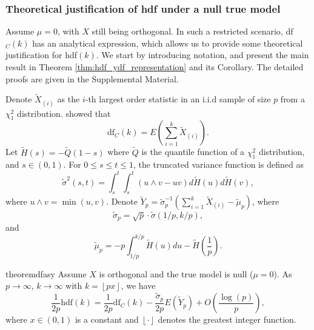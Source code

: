 \subsubsection{Theoretical justification of hdf under a null true model}
Assume $\mu=0$, with $X$ still being orthogonal. In such a restricted scenario, df$_C(k)$ has an analytical expression, which allows us to provide some theoretical justification for hdf$(k)$. We start by introducing notation, and present the main result in Theorem \ref{thm:hdf_ydf_representation} and its Corollary. The detailed proofs are given in the Supplemental Material.

Denote $\tilde{X}_{(i)}$ as the $i$-th largest order statistic in an i.i.d sample of size $p$ from a $\chi^2_1$ distribution. \citet{Ye1998} showed that
\begin{equation*}
\text{df}_C(k) = E\left( \sum_{i=1}^{k} \tilde{X}_{(i)} \right).
\end{equation*}
Let $\tilde{H}(s) = -\tilde{Q}(1-s)$ where $\tilde{Q}$ is the quantile function of a $\chi_1^2$ distribution, and $s\in (0,1)$. For $0\le s \le t \le 1$, the truncated variance function is defined as
\begin{equation*}
\tilde{\sigma}^2(s,t) = \int_{s}^{t} \int_{s}^{t} (u \wedge v -uv) d \tilde{H}(u) d \tilde{H}(v),
\end{equation*}
where $u \wedge v =\min(u,v)$. Denote $\tilde{Y}_p = \tilde{\sigma}_p^{-1}(\sum_{i=1}^k \tilde{X}_{(i)} - \tilde{\mu}_p)$, where
\begin{equation*}
\tilde{\sigma}_p = \sqrt{p} \cdot \tilde{\sigma}(1/p,k/p),
\end{equation*}
and
\begin{equation*}
\tilde{\mu}_p = -p \int_{1/p}^{k/p} \tilde{H}(u) du - \tilde{H}\left(\frac{1}{p}\right).
\end{equation*}

\begin{restatable}{theorem}{dfasy}
	\label{thm:hdf_ydf_representation}
	Assume $X$ is orthogonal and the true model is null ($\mu=0$). As $p\rightarrow  \infty$,  $k\rightarrow  \infty$ with $k=\left \lfloor{px}\right \rfloor$, we have
	\begin{equation}
	\label{eq:hdf_ydf_yp_representation}
	\frac{1}{2p} \text{hdf}(k) = \frac{1}{2p}\text{df}_C(k) - \frac{\tilde{\sigma}_p}{2p}E(\tilde{Y}_p) + O\left(\frac{\log(p)}{p} \right),
	\end{equation}
	where $x \in (0,1)$ is a constant and $\left \lfloor{\cdot}\right \rfloor$ denotes the greatest integer function.
\end{restatable}

